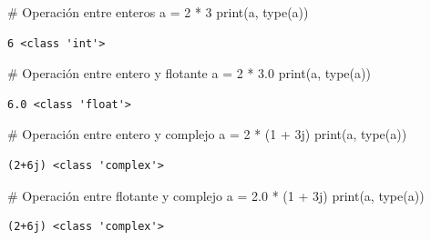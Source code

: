 \documentclass[
  spanish,
  letterpaper,
]{scrbook}
\newenvironment{Shaded}{\begin{snugshade}}{\end{snugshade}}
\newcommand{\BuiltInTok}[1]{\textcolor[rgb]{0.00,0.23,0.31}{#1}}
\newcommand{\CommentTok}[1]{\textcolor[rgb]{0.37,0.37,0.37}{#1}}
\newcommand{\DecValTok}[1]{\textcolor[rgb]{0.68,0.00,0.00}{#1}}
\newcommand{\FloatTok}[1]{\textcolor[rgb]{0.68,0.00,0.00}{#1}}
\newcommand{\NormalTok}[1]{\textcolor[rgb]{0.00,0.23,0.31}{#1}}
\newcommand{\OperatorTok}[1]{\textcolor[rgb]{0.37,0.37,0.37}{#1}}
\newcommand{\OtherTok}[1]{\textcolor[rgb]{0.00,0.23,0.31}{#1}}
\theoremstyle{definition}
\theoremstyle{remark}
\begin{document}
\begin{Shaded}
\begin{Highlighting}[]
\CommentTok{\# Operación entre enteros}
\NormalTok{a }\OperatorTok{=} \DecValTok{2} \OperatorTok{*} \DecValTok{3}
\BuiltInTok{print}\NormalTok{(a, }\BuiltInTok{type}\NormalTok{(a))}
\end{Highlighting}
\end{Shaded}

\begin{verbatim}
6 <class 'int'>
\end{verbatim}

\begin{Shaded}
\begin{Highlighting}[]
\CommentTok{\# Operación entre entero y flotante}
\NormalTok{a }\OperatorTok{=} \DecValTok{2} \OperatorTok{*} \FloatTok{3.0}
\BuiltInTok{print}\NormalTok{(a, }\BuiltInTok{type}\NormalTok{(a))}
\end{Highlighting}
\end{Shaded}

\begin{verbatim}
6.0 <class 'float'>
\end{verbatim}

\begin{Shaded}
\begin{Highlighting}[]
\CommentTok{\# Operación entre entero y complejo}
\NormalTok{a }\OperatorTok{=} \DecValTok{2} \OperatorTok{*}\NormalTok{ (}\DecValTok{1} \OperatorTok{+} \OtherTok{3j}\NormalTok{)}
\BuiltInTok{print}\NormalTok{(a, }\BuiltInTok{type}\NormalTok{(a))}
\end{Highlighting}
\end{Shaded}

\begin{verbatim}
(2+6j) <class 'complex'>
\end{verbatim}

\begin{Shaded}
\begin{Highlighting}[]
\CommentTok{\# Operación entre flotante y complejo}
\NormalTok{a }\OperatorTok{=} \FloatTok{2.0} \OperatorTok{*}\NormalTok{ (}\DecValTok{1} \OperatorTok{+} \OtherTok{3j}\NormalTok{)}
\BuiltInTok{print}\NormalTok{(a, }\BuiltInTok{type}\NormalTok{(a))}
\end{Highlighting}
\end{Shaded}

\begin{verbatim}
(2+6j) <class 'complex'>
\end{verbatim}
\end{document}
